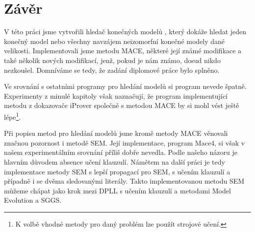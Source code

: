 \chapter{Závěr}

V této práci jsme vytvořili hledač konečných modelů \crossbow{},
který dokáže hledat jeden konečný model nebo všechny navzájem
neizomorfní konečné modely dané velikosti.
Implementovali jsme metodu MACE, některé její známé modifikace
a také několik nových modifikací, jenž, pokud je nám
známo, dosud nikdo nezkoušel.
Domníváme se tedy, že zadání diplomové práce bylo splněno.

Ve srovnání s ostatními programy pro hledání modelů si program \crossbow{}
nevede špatně. Experimenty z minulé kapitoly však naznačují,
že program implementující metodu z dokazovače iProver společně
s metodou MACE by si mohl vést ještě lépe\footnote{K volbě
vhodné metody pro daný problém lze použít strojové učení.}.

Při popisu metod pro hledání modelů jsme kromě metody MACE
věnovali značnou pozornost i metodě SEM.
Její implementace, program Mace4, si však v našem experimentálním
srovnání příliš dobře nevedla. Podle našeho názoru
je hlavním důvodem absence učení klauzulí.
Námětem na další práci je tedy implementace metody SEM
s lepší propagací pro SEM, s učením klauzulí
a případně i se dvěma sledovanými literály.
Takto implementovanou metodu SEM můžeme chápat jako krok
mezi DPLL s učením klauzulí a metodami Model Evolution a SGGS.


